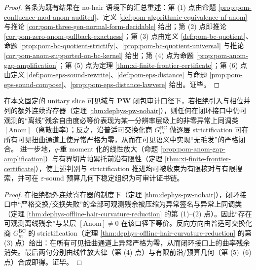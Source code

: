 \begin{proof}
各条为既有结果在 no-hair 语境下的汇总重述：第 (1) 点由命题 \ref{prop:pom-confluence-mod-anom-audited}、定义 \ref{def:pom-algorithmic-equivalence-nf-anom} 与推论 \ref{cor:pom-three-gen-normal-form-decidable} 给出；第 (2) 点即推论 \ref{cor:pom-zero-anom-pullback-exactness}；第 (3) 点由定义 \ref{def:pom-bc-quotient}、命题 \ref{prop:pom-bc-quotient-strictify}、\ref{prop:pom-bc-quotient-universal} 与推论 \ref{cor:pom-anom-supported-on-bc-kernel} 给出；第 (4) 点为命题 \ref{prop:pom-anom-gap-amplification}；第 (5) 点为定理 \ref{thm:xi-finite-frontier-certificate}；第 (6) 点由定义 \ref{def:pom-eps-sound-rewrite}、\ref{def:pom-eps-distance} 与命题 \ref{prop:pom-eps-sound-compose}、\ref{prop:pom-eps-distance-lawvere} 给出。证毕。
\end{proof}

\begin{corollary}\label{cor:dephys-offline-hair-iff-curvature}
在本文固定的 unitary slice 可见域与 \(\mathbf{PW}\) 闭包审计口径下，若拒绝引入与相位并列的额外连续寄存器（定理 \ref{thm:dephys-pw-nohair}），则任何在闭环接口中仍可观测的“离线”残余自由度必等价表现为某一分辨率层级上的非零异常上同调类 \([\mathrm{Anom}]\)（离散曲率）；反之，沿普适可交换化商 \(G^{\mathrm{BC}}_m\) 做逐层 strictification 可在所有可见扭曲通道上使异常严格为零，从而在可见语义中实现“无毛发”的严格闭合。
进一步地，\(q\)-重 moment 化的线性放大（命题 \ref{prop:pom-anom-gap-amplification}）与有界切片帕累托前沿有限性（定理 \ref{thm:xi-finite-frontier-certificate}），使上述判别与 strictification 推进均可被收束为有限核对与有限搜索，并可在 \(\varepsilon\)-sound 预算几何下稳定组织为可审计证书链。
\end{corollary}

\begin{proof}
在拒绝额外连续寄存器的制度下（定理 \ref{thm:dephys-pw-nohair}），闭环接口中“严格交换/交换失败”的全部可观测残余被压缩为异常签名与异常上同调类（定理 \ref{thm:dephys-offline-hair-curvature-reduction} 的第 (1)–(2) 点）。因此“存在可观测离线残余”与某层 \([\mathrm{Anom}]\neq 0\) 在该口径下等价。反向方向由普适可交换化商 \(G^{\mathrm{BC}}_m\) 的 strictification（定理 \ref{thm:dephys-offline-hair-curvature-reduction} 的第 (3) 点）给出：在所有可见扭曲通道上异常严格为零，从而闭环接口上的曲率残余消失。最后两句分别由线性放大律（第 (4) 点）与有限前沿/预算几何（第 (5)–(6) 点）合成即得。证毕。
\end{proof}

